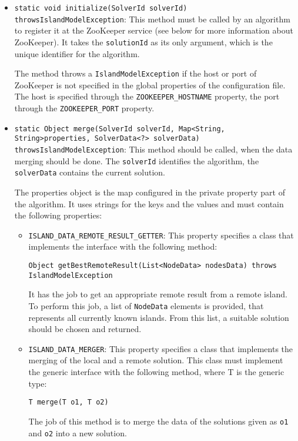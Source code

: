       
    
    \begin{itemize}
      \item \texttt{static void initialize(SolverId solverId) throws\newline IslandModelException}: This method must be called by an algorithm to register it at the ZooKeeper service (see below for more information about ZooKeeper). It takes the \texttt{solutionId} as its only argument, which is the unique identifier for the algorithm.
      
      The method throws a \texttt{IslandModelException} if the host or port of ZooKeeper is not specified in the global properties of the configuration file. The host is specified through the \texttt{ZOOKEEPER\_HOSTNAME} property, the port through the \texttt{ZOOKEEPER\_PORT} property.
      \item \texttt{static Object merge(SolverId solverId, Map<String, String>\newline properties, SolverData<?> solverData) throws\newline IslandModelException}: This method should be called, when the data merging should be done. The \texttt{solverId} identifies the algorithm, the \texttt{solverData} contains the current solution.
      
      The properties object is the map configured in the private property part of the algorithm. It uses strings for the keys and the values and must contain the following properties:
      \begin{itemize}
	\item \texttt{ISLAND\_DATA\_REMOTE\_RESULT\_GETTER}: This property specifies a class that implements the interface  with the following method:
	\begin{lstlisting}
Object getBestRemoteResult(List<NodeData> nodesData) throws IslandModelException
	\end{lstlisting}
	It has the job to get an appropriate remote result from a remote island. To perform this job, a list of \texttt{NodeData} elements is provided, that represents all currently known islands. From this list, a suitable solution should be chosen and returned.
	\item \texttt{ISLAND\_DATA\_MERGER}: This property specifies a class that implements the merging of the local and a remote solution. This class must implement the generic  interface with the following method, where T is the generic type:
	\begin{lstlisting}
T merge(T o1, T o2)
	\end{lstlisting}      
	The job of this method is to merge the data of the solutions given as \texttt{o1} and \texttt{o2} into a new solution.
      \end{itemize}
      

\end{itemize}
